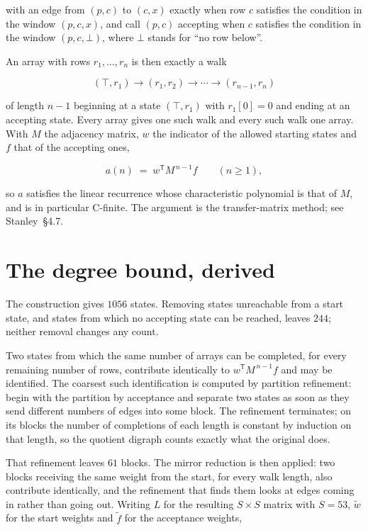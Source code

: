 \documentclass[11pt]{article}
\theoremstyle{definition}
\begin{document}
with an edge from $(p,c)$ to $(c,x)$ exactly when row $c$ satisfies the condition in the window $(p,c,x)$, and call $(p,c)$ accepting when $c$ satisfies the condition in the window $(p,c,\bot)$, where $\bot$ stands for ``no row below''.

An array with rows $r_1,\dots,r_n$ is then exactly a walk

\[(\top,r_1) \to (r_1,r_2) \to \cdots \to (r_{n-1},r_n)\]

of length $n-1$ beginning at a state $(\top,r_1)$ with $r_1[0]=0$ and ending at an accepting state. Every array gives one such walk and every such walk one array. With $M$ the adjacency matrix, $w$ the indicator of the allowed starting states and $f$ that of the accepting ones,

\[a(n) \;=\; w^{\mathsf T} M^{\,n-1} f \qquad (n \ge 1),\]

so $a$ satisfies the linear recurrence whose characteristic polynomial is that of $M$, and is in particular C-finite. The argument is the transfer-matrix method; see Stanley~\S4.7.

\section{The degree bound, derived}

The construction gives $1056$ states. Removing states unreachable from a start state, and states from which no accepting state can be reached, leaves $244$; neither removal changes any count.

Two states from which the same number of arrays can be completed, for every remaining number of rows, contribute identically to $w^{\mathsf T}M^{\,n-1}f$ and may be identified. The coarsest such identification is computed by partition refinement: begin with the partition by acceptance and separate two states as soon as they send different numbers of edges into some block. The refinement terminates; on its blocks the number of completions of each length is constant by induction on that length, so the quotient digraph counts exactly what the original does.

That refinement leaves $61$ blocks. The mirror reduction is then applied: two blocks receiving the same weight from the start, for every walk length, also contribute identically, and the refinement that finds them looks at edges coming in rather than going out. Writing $L$ for the resulting $S \times S$ matrix with $S = 53$, $\tilde w$ for the start weights and $\tilde f$ for the acceptance weights,
\end{document}
